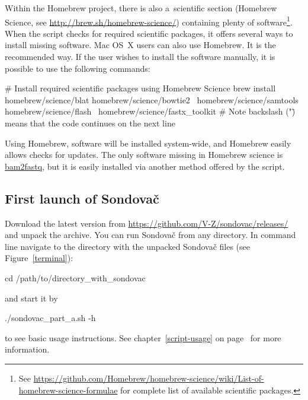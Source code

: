 \documentclass[a4paper, 11pt, twoside]{article}
\begin{document}
Within the Homebrew project, there is also a~scientific section (Homebrew Science, see \url{http://brew.sh/homebrew-science/}) containing plenty of software\footnote{See \url{https://github.com/Homebrew/homebrew-science/wiki/List-of-homebrew-science-formulae} for co\-mplete list of available scientific packages.}. When the script checks for required scientific packages, it offers several ways to install missing software. Mac OS~X users can also use Homebrew. It is the recommended way. If the user wishes to install the software manually, it is possible to use the following commands:

\begin{bashcode}
  # Install required scientific packages using Homebrew Science
  brew install homebrew/science/blat homebrew/science/bowtie2 \
    homebrew/science/samtools homebrew/science/flash \
    homebrew/science/fastx_toolkit
  # Note backslash ("\") means that the code continues on the next line
\end{bashcode}

Using Homebrew, software will be installed system-wide, and Homebrew easily allows checks for updates. The only software missing in Homebrew science is \href{http://gsl.hudsonalpha.org/information/software/bam2fastq}{bam2fastq}, but it is easily installed via another method offered by the script. %

\subsection{First launch of Sondovač}
\label{script-start}

Download the latest version from \url{https://github.com/V-Z/sondovac/releases/} and unpack the archive. You can run Sondovač from any directory. In command line navigate to the directory with the unpacked Sondovač files (see Figure~\ref{terminal}):

\begin{bashcode}
  cd /path/to/directory_with_sondovac
\end{bashcode}

and start it by

\begin{bashcode}
  ./sondovac_part_a.sh -h
\end{bashcode}

to see basic usage instructions. See chapter~\ref{script-usage} on page~\pageref{script-usage} for more information.
\end{document}

